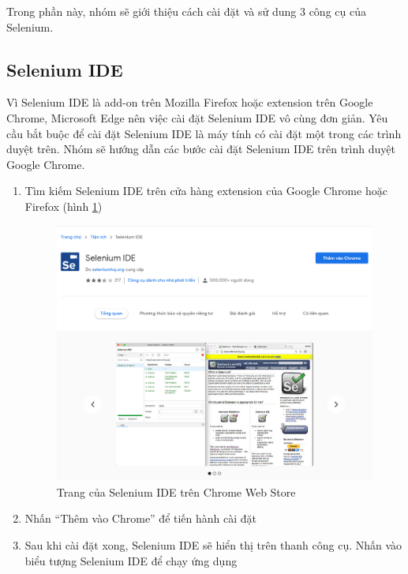 \documentclass[./../main_file.tex]{subfiles}
\begin{document}
	
	Trong phần này, nhóm sẽ giới thiệu cách cài đặt và sử dung 3 công cụ của Selenium.
		
	\subsection{Selenium IDE}
	
	Vì Selenium IDE là add-on trên Mozilla Firefox hoặc extension trên Google Chrome, Microsoft Edge nên việc cài đặt Selenium IDE vô cùng đơn giản. Yêu cầu bắt buộc để cài đặt Selenium IDE là máy tính có cài đặt một trong các trình duyệt trên. Nhóm sẽ hướng dẫn các bước cài đặt Selenium IDE trên trình duyệt Google Chrome.
	
	\begin{enumerate}
		\item Tìm kiếm Selenium IDE trên cửa hàng extension của Google Chrome hoặc Firefox (hình \ref{fig:ide_chrome})
		\begin{figure}
			\includegraphics[width=\linewidth]{./images/ide_install.png}
			\caption{Trang của Selenium IDE trên Chrome Web Store}
			\label{fig:ide_chrome}
		\end{figure}
		\item Nhấn “Thêm vào Chrome” để tiến hành cài đặt %
		\item Sau khi cài đặt xong, Selenium IDE sẽ hiển thị trên thanh công cụ. Nhấn vào biểu tượng Selenium IDE để chạy ứng dụng
	\end{enumerate}
	
\end{document}
